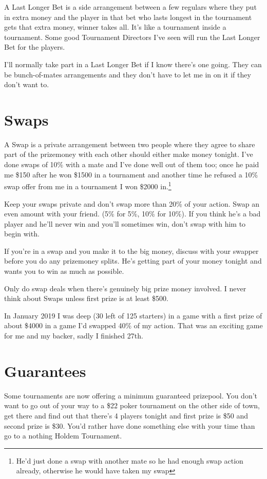 A Last Longer Bet is a side arrangement between a few regulars
where they put in extra money and the player
in that bet who lasts longest in the tournament gets that extra
money, winner takes all. It's like a tournament inside a tournament.
Some good Tournament Directors I've seen
will run the Last Longer Bet for the players.

I'll normally take part in a Last Longer Bet if I know there's one
going. They can be bunch-of-mates arrangements and
they don't have to let me in on it if they don't want to.

\section{Swaps}

A Swap is a private arrangement between two people where they
agree to share part of the prizemoney with each other should
either make money tonight. I've done swaps of 10\% with a mate and
I've done well out of them too; once he paid me
\$150 after he won \$1500 in a tournament and another time
he refused a 10\% swap offer from me in a tournament I won \$2000
in.\footnote{He'd just done a swap with another mate so he had enough
swap action already, otherwise he would have taken my swap}

Keep your swaps private and don't swap more than 20\% of your action.
Swap an even amount with your friend. (5\% for 5\%, 10\% for 10\%).
If you think he's a bad player and he'll never win and
you'll sometimes win, don't swap with him to begin with.

If you're in a swap and you make it to the big money, discuss
with your swapper before you do any prizemoney splits. He's
getting part of your money tonight and wants you to win as
much as possible.

Only do swap deals when there's genuinely big prize money involved.
I never think about Swaps unless first prize is at least \$500.

In January 2019 I was deep (30 left of 125 starters) in a game with
a first prize of about \$4000 in a game I'd swapped 40\% of my action.
That was an exciting game for me and my backer, sadly I finished
27th.

\section{Guarantees}

Some tournaments are now offering a minimum guaranteed prizepool. You
don't want to go out of your way to a \$22 poker tournament on the
other side of town, get there and find out that there's 4 players tonight
and first prize is \$50 and second prize is \$30. You'd rather have
done something else with your time than go to a nothing Holdem Tournament.

